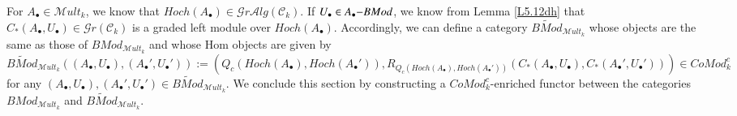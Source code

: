 \documentclass[10pt, colorlinks]{article}
\numberwithin{equation}{section} \DeclareMathSizes{2}{10}{12}{13}
\begin{document}
  \smallskip
  For $A_\bullet\in \mathscr Mult_k$, we know that $Hoch(A_\bullet)\in \mathscr Gr\mathcal Alg(\mathcal C_k)$. If $U_\bullet\in A_\bullet{\small{-}}BMod$, we know from Lemma \ref{L5.12dh} that $C_*(A_\bullet, U_\bullet)\in \mathscr Gr(\mathcal C_k)$ is a graded left module over $Hoch(A_\bullet)$.  Accordingly, we can define a category $\widetilde{BMod}_{\mathscr Mult_k}$ whose objects are the same as those of $BMod_{\mathscr Mult_k}$ and whose Hom objects are given by 
\begin{equation}
    \widetilde{BMod}_{\mathscr Mult_k}\left((A_\bullet,U_\bullet),(A_\bullet',U_\bullet')\right):=\left(Q_c(Hoch(A_\bullet),Hoch(A_\bullet')),R_{Q_c(Hoch(A_\bullet),Hoch(A_\bullet'))}(C_*(A_\bullet,U_\bullet),C_*(A_\bullet',U_\bullet'))\right)\in CoMod_k^c
\end{equation}
for any $(A_\bullet,U_\bullet),(A_\bullet',U_\bullet')\in \widetilde{BMod}_{\mathscr Mult_k}$. We conclude this section by constructing a $CoMod_k^c$-enriched functor between the categories ${BMod}_{\mathscr Mult_k}$ and $\widetilde{BMod}_{\mathscr Mult_k}$.
  
\end{document}
